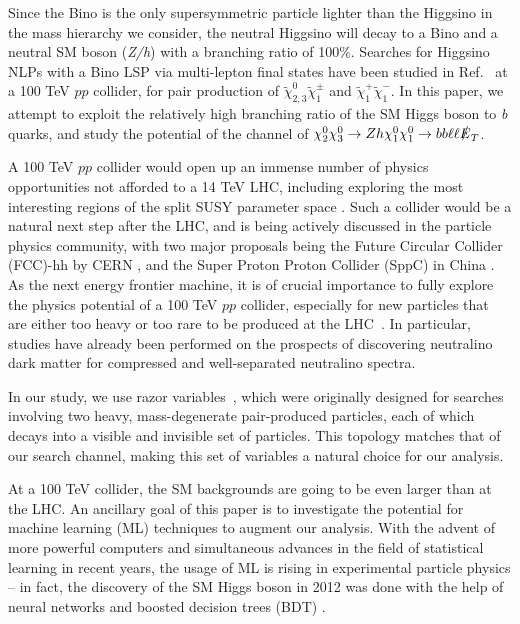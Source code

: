 \documentclass[a4paper,11pt]{article}
\newcommand{\met}{{\slashed{E}_T}}
\begin{document}
 

Since the Bino is the only supersymmetric particle lighter than the Higgsino in
the mass hierarchy we consider, the neutral Higgsino will decay to a Bino and a
neutral SM boson (\emph{Z/h}) with a branching ratio of 100\%.  Searches for
Higgsino NLPs with a Bino LSP  via  multi-lepton final states have been
studied in Ref.~\cite{Gori:2014oua} at a 100 TeV $pp$ collider, for pair production of $\widetilde\chi_{2,3}^0\widetilde\chi_1^\pm$ and  $\widetilde\chi_{1}^+\widetilde\chi_1^-$.    In this paper, we attempt to exploit the relatively high branching
ratio of the SM Higgs boson to \emph{b} quarks, and study the potential of the channel of
$\chi_2^0\chi_3^0\rightarrow Zh \chi_1^0\chi_1^0\rightarrow bb\ell\ell \met$.

A 100 TeV $pp$ collider would open up an immense number of physics
opportunities not afforded to a 14 TeV LHC, including exploring the
most interesting regions of the split SUSY parameter space
\cite{Arkani-Hamed:2015vfh}.
Such a collider would be a natural next step after the LHC, and is being
actively discussed in the particle physics community, with two major
proposals being the Future Circular Collider (FCC)-hh by CERN \cite{FCC-hh}, and the Super Proton Proton Collider (SppC)  
in China \cite{CEPC}.  As the next energy frontier machine, it is of 
crucial importance to fully explore the physics potential of a 100 TeV $pp$
collider, especially for new particles that are either too heavy or too rare 
to be produced at the LHC~\cite{Arkani-Hamed:2015vfh,Contino:2016spe,Golling:2016gvc,Mangano:2016jyj}.
In particular, studies have already been performed on the prospects of
discovering neutralino dark matter for compressed \cite{Low:2014cba, diCortona:2014yua,Cirelli:2014dsa,Mahbubani:2018tin,Han:2018wus}
and well-separated \cite{Gori:2014oua,Acharya:2014pua}
neutralino spectra.


In our study, we use razor variables~\cite{Rogan:2010kb}, which were originally designed
for searches involving two heavy, mass-degenerate pair-produced
particles, each of which decays into a visible and invisible set of
particles. This topology matches that of our search channel, making this
set of variables a natural choice for our analysis.  

At a 100 TeV collider, the  SM backgrounds are going to be even larger than
at the LHC.  An ancillary goal of this paper is to investigate the
potential for machine learning (ML) techniques to augment our analysis.
With the advent of more powerful computers and simultaneous advances in
the field of statistical learning in recent years, the usage of ML is
rising in experimental particle physics -- in fact, the discovery of the
SM Higgs boson in 2012 was done with the help of neural networks
\cite{Aad:2012tfa} and boosted decision trees (BDT)
\cite{Chatrchyan:2012xdj}.
\end{document}
